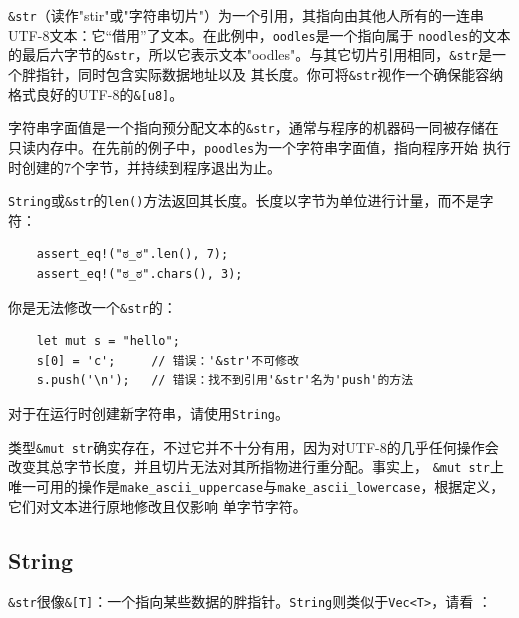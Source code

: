 \medskip
\texttt{\&str}（读作"stir"或"字符串切片"）为一个引用，其指向由其他人所有的一连串UTF-8文本：它“借用”了文本。在此例中，\texttt{oodles}是一个指向属于
\texttt{noodles}的文本的最后六字节的\texttt{\&str}，所以它表示文本"oodles"。与其它切片引用相同，\texttt{\&str}是一个胖指针，同时包含实际数据地址以及
其长度。你可将\texttt{\&str}视作一个确保能容纳格式良好的UTF-8的\texttt{\&[u8]}。

\medskip
字符串字面值是一个指向预分配文本的\texttt{\&str}，通常与程序的机器码一同被存储在只读内存中。在先前的例子中，\texttt{poodles}为一个字符串字面值，指向程序开始
执行时创建的7个字节，并持续到程序退出为止。

\medskip
\texttt{String}或\texttt{\&str}的\texttt{len()}方法返回其长度。长度以字节为单位进行计量，而不是字符：
\begin{verbatim}
    assert_eq!("ಠ_ಠ".len(), 7);
    assert_eq!("ಠ_ಠ".chars(), 3);
\end{verbatim}

\smallskip
你是无法修改一个\texttt{\&str}的：
\begin{verbatim}
    let mut s = "hello";
    s[0] = 'c';     // 错误：'&str'不可修改
    s.push('\n');   // 错误：找不到引用'&str'名为'push'的方法
\end{verbatim}

\smallskip
对于在运行时创建新字符串，请使用\texttt{String}。

\medskip
类型\texttt{\&mut str}确实存在，不过它并不十分有用，因为对UTF-8的几乎任何操作会改变其总字节长度，并且切片无法对其所指物进行重分配。事实上，
\texttt{\&mut str}上唯一可用的操作是\texttt{make\_ascii\_uppercase}与\texttt{make\_ascii\_lowercase}，根据定义，它们对文本进行原地修改且仅影响
单字节字符。

\subsection{String}
\texttt{\&str}很像\texttt{\&[T]}：一个指向某些数据的胖指针。\texttt{String}则类似于\texttt{Vec<T>}，请看 ：

